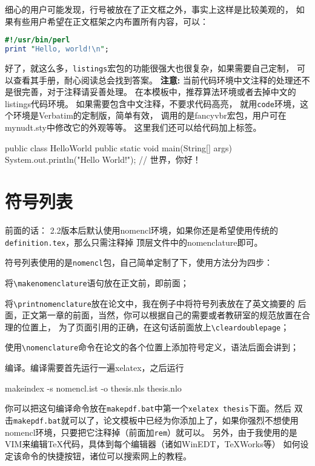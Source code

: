 细心的用户可能发现，行号被放在了正文框之外，事实上这样是比较美观的，
如果有些用户希望在正文框架之内布置所有内容，可以：
\begin{lstlisting}[language=perl,xleftmargin=2em,framexleftmargin=1.5em]
#!/usr/bin/perl
print "Hello, world!\n";
\end{lstlisting}

好了，就这么多，\texttt{listings}宏包的功能很强大也很复杂，如果需要自己定制，
可以查看其手册，耐心阅读总会找到答案。
\textbf{注意:} 当前代码环境中文注释的处理还不是很完善，对于注释请妥善处理。
在本模板中，推荐算法环境或者去掉中文的listings代码环境。
如果需要包含中文注释，不要求代码高亮，
就用\texttt{code}环境，这个环境是Verbatim的定制版，简单有效，
调用的是fancyvbr宏包，用户可在mynudt.sty中修改它的外观等等。
这里我们还可以给代码加上标签。
\begin{code}[label=hello.c]
  public class HelloWorld {
      public static void main(String[] args) {
          System.out.println("Hello World!");
        }
    }   // 世界，你好！
\end{code}

\section{符号列表}

 {\hei 前面的话：}{\kai\color{blue}
  2.2版本后默认使用nomencl环境，如果你还是希望使用传统的\verb|definition.tex|，那么只需注释掉
  顶层文件中的nomenclature即可。}

符号列表使用的是\verb|nomencl|包，自己简单定制了下，使用方法分为四步：
\begin{compactenum}
  \item 将\verb|\makenomenclature|语句放在正文前，即\verb||前面；
  \item 将\verb|\printnomenclature|放在论文中，我在例子中将符号列表放在了英文摘要的
  后面，正文第一章的前面，当然，你可以根据自己的需要或者教研室的规范放置在合理的位置上，
  为了页面引用的正确，在这句话前面放上\verb|\cleardoublepage|；
  \item 使用\verb|\nomenclature|命令在论文的各个位置上添加符号定义，语法后面会讲到；
  \item 编译。编译需要首先运行一遍xelatex，之后运行
  \begin{code}
    makeindex -s nomencl.ist -o thesis.nls thesis.nlo
  \end{code}
\end{compactenum}

你可以把这句编译命令放在\verb|makepdf.bat|中第一个\verb|xelatex thesis|下面。然后
双击\verb|makepdf.bat|就可以了，论文模板中已经为你添加上了，如果你强烈不想使用
nomencl环境，只要把它注释掉（前面加\verb|rem|）就可以。
另外，由于我使用的是VIM来编辑\TeX{}代码，具体到每个编辑器（诸如WinEDT，TeXWorks等）
如何设定该命令的快捷按钮，诸位可以搜索网上的教程。

